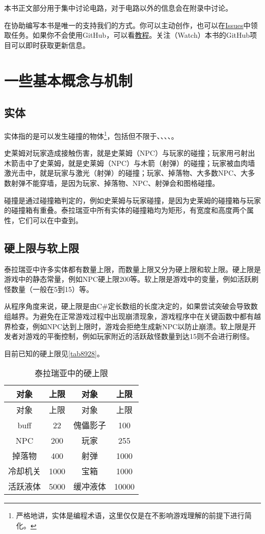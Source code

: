 本书正文部分用于集中讨论电路，对于电路以外的信息会在附录中讨论。

在协助编写本书是唯一的支持我们的方式。你可以主动创作，也可以在\href{https://github.com/putianyi889/TerrariaWiringTutorial/issues}{Issues}中领取任务。如果你不会使用GitHub，可以看\href{https://zhuanlan.zhihu.com/p/34693871}{教程}。关注（Watch）本书的GitHub项目可以即时获取更新信息。

\section{一些基本概念与机制}

\subsection{实体}
实体指的是可以发生碰撞的物体\footnote{严格地讲，实体是编程术语，这里仅仅是在不影响游戏理解的前提下进行简化。}，包括但不限于、、、、。

史莱姆对玩家造成接触伤害，就是史莱姆（NPC）与玩家的碰撞；玩家用弓射出木箭击中了史莱姆，就是史莱姆（NPC）与木箭（射弹）的碰撞；玩家被血肉墙激光击中，就是玩家与激光（射弹）的碰撞；玩家、掉落物、大多数NPC、大多数射弹不能穿墙，是因为玩家、掉落物、NPC、射弹会和图格碰撞。

碰撞是通过碰撞箱判定的，例如史莱姆与玩家碰撞，是因为史莱姆的碰撞箱与玩家的碰撞箱有重叠。泰拉瑞亚中所有实体的碰撞箱均为矩形，有宽度和高度两个属性，它们可以在中查到。

\subsection{硬上限与软上限}
泰拉瑞亚中许多实体都有数量上限，而数量上限又分为硬上限和软上限。硬上限是游戏中的静态常量，例如NPC硬上限200等。软上限是游戏中的变量，例如活跃刷怪数量（一般在5到15）等。

从程序角度来说，硬上限是由C\#定长数组的长度决定的，如果尝试突破会导致数组越界。为避免在正常游戏过程中出现崩溃现象，游戏程序中在关键函数中都有越界检查，例如NPC达到上限时，游戏会拒绝生成新NPC以防止崩溃。软上限是开发者对游戏的平衡控制，例如玩家附近的活跃敌怪数量到达15则不会进行刷怪。

目前已知的硬上限见\autoref{tab8928}。
\begin{longtable}{|cc||cc|}
\caption{泰拉瑞亚中的硬上限}\label{tab8928}\\\hline
对象&上限&对象&上限\\\hline
\endfirsthead
\hline 对象&上限&对象&上限\\\hline
\endhead
\hline
\endfoot
buff&22&傀儡影子&100\\\hline

NPC&200&玩家&255\\\hline

掉落物&400&射弹&1000\\\hline

冷却机关&1000&宝箱&1000\\\hline

活跃液体&5000&缓冲液体&10000
\end{longtable}

